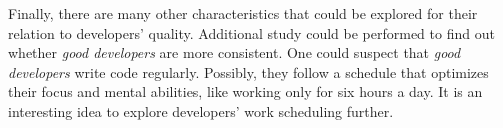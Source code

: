 Finally, there are many other characteristics that could be explored for their relation to developers’ quality. Additional study could be performed to find out whether \textit{good developers} are more consistent. One could suspect that \textit{good developers} write code regularly. Possibly, they follow a schedule that optimizes their focus and mental abilities, like working only for six hours a day. It is an interesting idea to explore developers’ work scheduling further.

